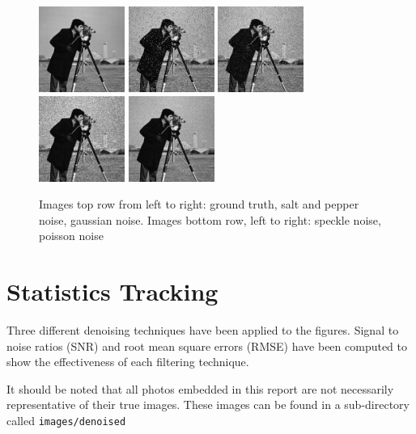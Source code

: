 \documentclass{article}
\begin{document}
\begin{figure}[H]
  \centering
  \includegraphics[width=0.25\textwidth]{images/camera_truth}
  \includegraphics[width=0.25\textwidth]{images/camera_noisy1}
  \includegraphics[width=0.25\textwidth]{images/camera_noisy2}
  \includegraphics[width=0.25\textwidth]{images/camera_noisy3}
  \includegraphics[width=0.25\textwidth]{images/camera_noisy4}
  \caption{Images top row from left to right: ground truth, salt and pepper
    noise, gaussian noise. Images bottom row, left to right: speckle noise, poisson noise}
\end{figure}   
% 
\section{Statistics Tracking}
\label{sec:stats-tracking}
% 
Three different denoising techniques have been applied to the
figures. Signal to noise ratios (SNR) and root mean
square errors (RMSE) have been computed to show the effectiveness of each
filtering technique. \par
%
It should be noted that all photos embedded in this report are not
necessarily representative of their true images. These images can be
found in a sub-directory called \texttt{images/denoised}
% 
\end{document}
